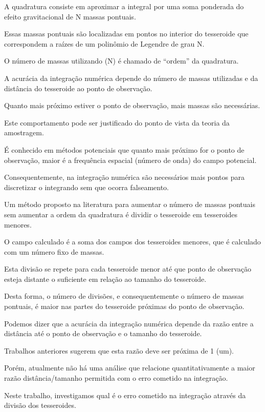 \documentclass[12pt]{letter}
\begin{document}
\begin{flushleft}
A quadratura consiste em aproximar a integral por uma soma ponderada do efeito
gravitacional de N massas pontuais.

Essas massas pontuais são localizadas em pontos no interior do tesseroide que
correspondem a raízes de um polinômio de Legendre de grau N.

O número de massas utilizando (N) é chamado de ``ordem'' da quadratura.

A acurácia da integração numérica depende do número de massas utilizadas e da
distância do tesseroide ao ponto de observação.

Quanto mais próximo estiver o ponto de observação, mais massas são necessárias.

Este comportamento pode ser justificado do ponto de vista da teoria da
amostragem.

É conhecido em métodos potenciais que quanto mais próximo for o ponto de observação, maior é a frequência espacial
(número de onda) do campo potencial.

Consequentemente, na integração numérica são necessários mais pontos para discretizar o integrando sem
que ocorra falseamento.



Um método proposto na literatura para aumentar o número de massas pontuais sem
aumentar a ordem da quadratura é dividir o tesseroide em tesseroides menores.

O campo calculado é a soma dos campos dos tesseroides menores, que é calculado com um número fixo de massas.

Esta divisão se repete para cada tesseroide menor até que ponto de observação
esteja distante o suficiente em relação ao tamanho do tesseroide.

Desta forma, o número de divisões, e consequentemente o número de massas
pontuais, é maior nas partes do tesseroide próximas do ponto de observação.

Podemos dizer que a acurácia da integração numérica depende da razão entre a
distância até o ponto de observação e o tamanho do tesseroide.

Trabalhos anteriores sugerem que esta razão deve ser próxima de 1 (um).

Porém, atualmente não há uma análise que relacione quantitativamente
a maior razão distância/tamanho permitida com o erro cometido na integração.



Neste trabalho, investigamos qual é o erro cometido na integração através da
divisão dos tesseroides.


\end{flushleft}
\end{document}
